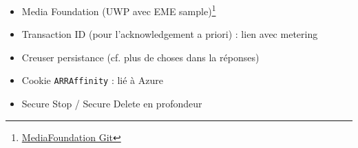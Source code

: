 \documentclass[french]{article}
\begin{document}
\begin{itemize}
	\item[\checkmark] Media Foundation (UWP avec EME sample)\footnote{\href{https://github.com/microsoft/media-foundation/blob/master/samples/}{MediaFoundation Git}}
	
	\item[\checkmark] Transaction ID (pour l'acknowledgement a priori) : lien avec metering
	
	\item Creuser persistance (cf. plus de choses dans la réponses)
	
	\item[\checkmark] Cookie \texttt{ARRAffinity} : lié à Azure
	
	\item Secure Stop / Secure Delete en profondeur
\end{itemize}
\end{document}
